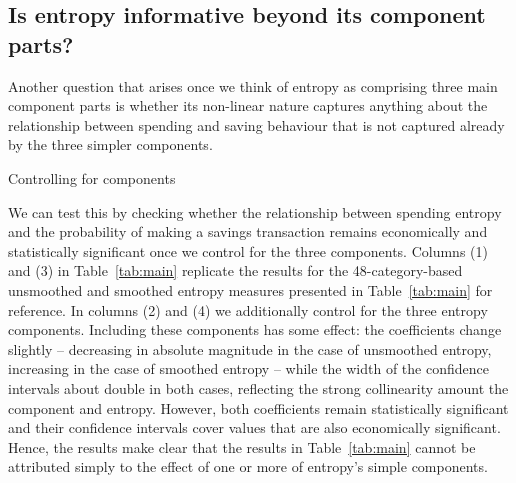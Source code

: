 \subsection{Is entropy informative beyond its component parts?}%
\label{sub:is_entropy_informative_beyond_its_component_parts_}

Another question that arises once we think of entropy as comprising three main
component parts is whether its non-linear nature captures anything about the
relationship between spending and saving behaviour that is not captured already
by the three simpler components. 

\begin{landscape}
\begin{table}[ht]
\centering\scriptsize
\caption{Controlling for components}
\label{tab:components}

\end{table}
\end{landscape}

We can test this by checking whether the relationship between spending entropy
and the probability of making a savings transaction remains economically and
statistically significant once we control for the three components. Columns (1)
and (3) in Table~\ref{tab:main} replicate the results for the 48-category-based
unsmoothed and smoothed entropy measures presented in Table~\ref{tab:main} for
reference. In columns (2) and (4) we additionally control for the three entropy
components. Including these components has some effect: the coefficients change
slightly -- decreasing in absolute magnitude in the case of unsmoothed entropy,
increasing in the case of smoothed entropy -- while the width of the confidence
intervals about double in both cases, reflecting the strong collinearity amount
the component and entropy. However, both coefficients remain statistically
significant and their confidence intervals cover values that are also
economically significant. Hence, the results make clear that the results in
Table~\ref{tab:main} cannot be attributed simply to the effect of one or more
of entropy's simple components.



